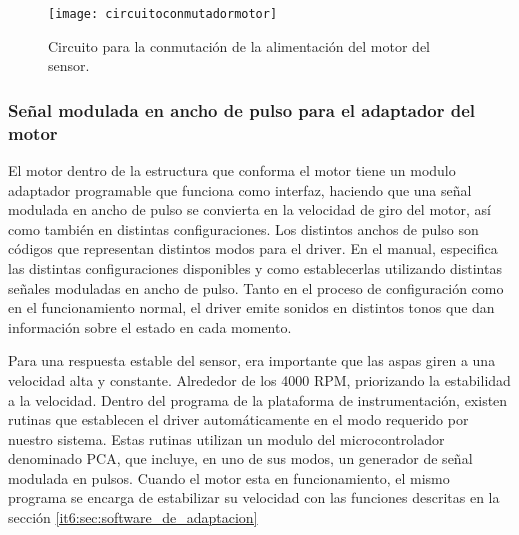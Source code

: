 \begin{figure}[h]
  \centering
  \texttt{[image: circuitoconmutadormotor]}
  \caption{Circuito para la conmutación de la alimentación del motor del sensor.}\label{fig:circuitoconmutadormotor}
\end{figure}


\subsubsection{Señal modulada en ancho de pulso para el adaptador del motor} %
\label{it6:ssub:señal_modulada_en_ancho_de_pulso_para_el_adaptador_del_motor}


El motor dentro de la estructura que conforma el motor tiene un modulo adaptador programable que funciona como interfaz, haciendo que una señal modulada en ancho de pulso se convierta en la velocidad de giro del motor, así como también en distintas configuraciones. Los distintos anchos de pulso son códigos que representan distintos modos para el driver. En el manual, especifica las distintas configuraciones disponibles y como establecerlas utilizando distintas señales moduladas en ancho de pulso. Tanto en el proceso de configuración como en el funcionamiento normal, el driver emite sonidos en distintos tonos que dan información sobre el estado en cada momento.

Para una respuesta estable del sensor, era importante que las aspas giren a una velocidad alta y constante. Alrededor de los 4000 RPM, priorizando la estabilidad a la velocidad. Dentro del programa de la plataforma de instrumentación, existen rutinas que establecen el driver automáticamente en el modo requerido por nuestro sistema. Estas rutinas utilizan un modulo del microcontrolador denominado PCA, que incluye, en uno de sus modos, un generador de señal modulada en pulsos. Cuando el motor esta en funcionamiento, el mismo programa se encarga de estabilizar su velocidad con las funciones descritas en la sección \ref{it6:sec:software_de_adaptacion}


